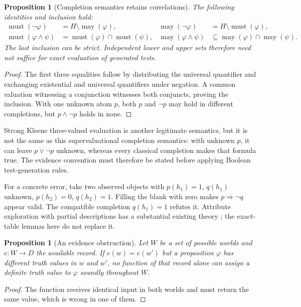 \documentclass[11pt]{article}
\newtheorem{proposition}[theorem]{Proposition}
\theoremstyle{definition}
\begin{document}
\begin{proposition}[Completion semantics retains correlations]
The following identities and inclusion hold:
\begin{align*}
 \operatorname{must}(\neg\varphi)&=H\setminus\operatorname{may}(\varphi),&
 \operatorname{may}(\neg\varphi)&=H\setminus\operatorname{must}(\varphi),\\
 \operatorname{must}(\varphi\wedge\psi)
 &=\operatorname{must}(\varphi)\cap\operatorname{must}(\psi),&
 \operatorname{may}(\varphi\wedge\psi)
 &\subseteq\operatorname{may}(\varphi)\cap\operatorname{may}(\psi).
\end{align*}
The last inclusion can be strict. Independent lower and upper sets therefore
need not suffice for exact evaluation of generated tests.
\end{proposition}
\begin{proof}
The first three equalities follow by distributing the universal quantifier
and exchanging existential and universal quantifiers under negation.
A common valuation witnessing a conjunction witnesses both conjuncts,
proving the inclusion. With one unknown atom $p$, both $p$ and $\neg p$
may hold in different completions, but $p\wedge\neg p$ holds in none.
\end{proof}

Strong Kleene three-valued evaluation is another legitimate semantics, but
it is not the same as this supervaluational completion semantics: with
unknown $p$, it can leave $p\vee\neg p$ unknown, whereas every classical
completion makes that formula true. The evidence convention must therefore
be stated before applying Boolean test-generation rules.

For a concrete error, take two observed objects with
$p(h_1)=1$, $q(h_1)$ unknown, $p(h_2)=0$, $q(h_2)=1$.
Filling the blank with zero makes $p\Rightarrow\neg q$ appear valid.
The compatible completion $q(h_1)=1$ refutes it. Attribute exploration with
partial descriptions has a substantial existing theory
\cite{BorchmannGanter}; the exact-table lemmas here do not replace it.

\begin{proposition}[An evidence obstruction]\label{prop:evidence}
Let $W$ be a set of possible worlds and $e:W\to D$ the available record.
If $e(w)=e(w')$ but a proposition $\varphi$ has different truth values
in $w$ and $w'$, no function of that record alone can assign a definite
truth value to $\varphi$ soundly throughout $W$.
\end{proposition}
\begin{proof}
The function receives identical input in both worlds and must return the
same value, which is wrong in one of them.
\end{proof}
\end{document}
